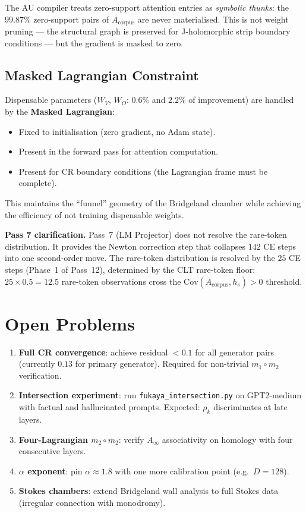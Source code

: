 \documentclass[11pt]{amsart}
\begin{document}
The AU compiler treats zero-support attention entries as \emph{symbolic thunks}:
the $99.87\%$ zero-support pairs of $A_\mathrm{corpus}$ are never materialised.
This is not weight pruning --- the structural graph is preserved for
J-holomorphic strip boundary conditions --- but the gradient is masked to zero.

\subsection{Masked Lagrangian Constraint}

Dispensable parameters ($W_V$, $W_O$: $0.6\%$ and $2.2\%$ of improvement)
are handled by the \textbf{Masked Lagrangian}:
\begin{itemize}
\item Fixed to initialisation (zero gradient, no Adam state).
\item Present in the forward pass for attention computation.
\item Present for CR boundary conditions (the Lagrangian frame must be complete).
\end{itemize}
This maintains the ``funnel'' geometry of the Bridgeland chamber
while achieving the efficiency of not training dispensable weights.

\textbf{Pass 7 clarification.}
Pass~7 (LM Projector) does not resolve the rare-token distribution.
It provides the Newton correction step that collapses $142$ CE steps
into one second-order move.
The rare-token distribution is resolved by the $25$ CE steps (Phase~1
of Pass~12), determined by the CLT rare-token floor:
$25 \times 0.5 = 12.5$ rare-token observations cross the
$\mathrm{Cov}(A_\mathrm{corpus},h_s) > 0$ threshold.

\section{Open Problems}
\label{sec:open}

\begin{enumerate}
\item \textbf{Full CR convergence}: achieve residual $<0.1$ for all
  generator pairs (currently $0.13$ for primary generator).
  Required for non-trivial $m_1\circ m_2$ verification.
\item \textbf{Intersection experiment}: run
  \texttt{fukaya\_intersection.py} on GPT2-medium with factual and
  hallucinated prompts. Expected: $\rho_k$ discriminates at late layers.
\item \textbf{Four-Lagrangian $m_2\circ m_2$}: verify $A_\infty$
  associativity on homology with four consecutive layers.
\item \textbf{$\alpha$ exponent}: pin $\alpha\approx 1.8$ with one more
  calibration point (e.g.\ $D=128$).
\item \textbf{Stokes chambers}: extend Bridgeland wall analysis to
  full Stokes data (irregular connection with monodromy).
\end{enumerate}
\end{document}
